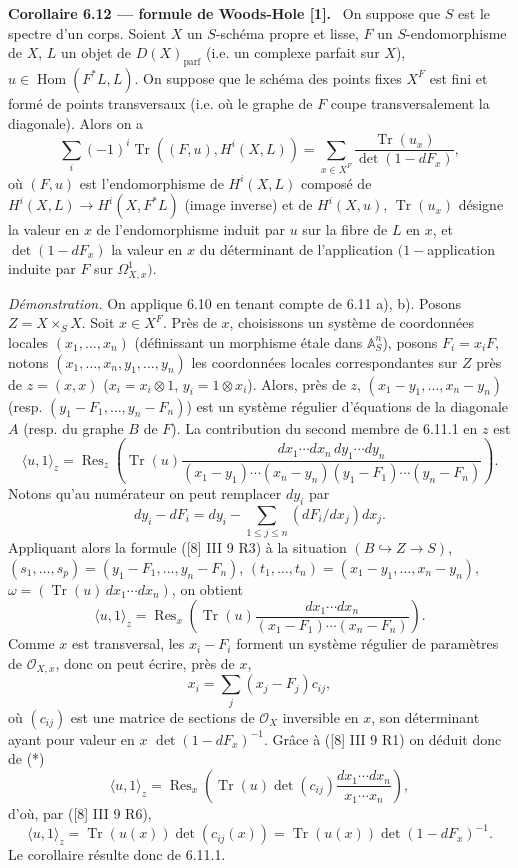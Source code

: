 \documentclass[11pt]{article}
\newenvironment{statement}[1]{\par\medskip\noindent\textbf{#1.}\ }{\par\medskip}
\DeclareMathOperator{\Hom}{Hom}
\providecommand{\Tr}{\operatorname{Tr}}
\providecommand{\parf}{\mathrm{parf}}
\providecommand{\OO}{\mathcal O}
\providecommand{\Res}{\operatorname{Res}}
\begin{document}
\begin{statement}{Corollaire 6.12 --- formule de Woods-Hole [1]}
On suppose que $S$ est le spectre d'un corps. Soient $X$ un $S$-schéma propre et lisse, $F$ un $S$-endomorphisme de $X$, $L$ un objet de $D(X)_{\parf}$ (i.e. un complexe parfait sur $X$), $u\in\Hom(F^*L,L)$. On suppose que le schéma des points fixes $X^F$ est fini et formé de points transversaux (i.e. où le graphe de $F$ coupe transversalement la diagonale). Alors on a
\begin{equation}
\tag{6.12.1}
\sum_i(-1)^i\Tr((F,u),H^i(X,L))=
\sum_{x\in X^F}\frac{\Tr(u_x)}{\det(1-dF_x)},
\end{equation}
où $(F,u)$ est l'endomorphisme de $H^i(X,L)$ composé de $H^i(X,L)\to H^i(X,F^*L)$ (image inverse) et de $H^i(X,u)$, $\Tr(u_x)$ désigne la valeur en $x$ de l'endomorphisme induit par $u$ sur la fibre de $L$ en $x$, et $\det(1-dF_x)$ la valeur en $x$ du déterminant de l'application $(1-$application induite par $F$ sur $\Omega^1_{X,x})$.

\emph{Démonstration.} On applique 6.10 en tenant compte de 6.11 a), b). Posons $Z=X\times_SX$. Soit $x\in X^F$. Près de $x$, choisissons un système de coordonnées locales $(x_1,\ldots,x_n)$ (définissant un morphisme étale dans $\mathbb A^n_S$), posons $F_i=x_iF$, notons $(x_1,\ldots,x_n,y_1,\ldots,y_n)$ les coordonnées locales correspondantes sur $Z$ près de $z=(x,x)$ ($x_i=x_i\otimes1$, $y_i=1\otimes x_i$). Alors, près de $z$, $(x_1-y_1,\ldots,x_n-y_n)$ (resp. $(y_1-F_1,\ldots,y_n-F_n)$) est un système régulier d'équations de la diagonale $A$ (resp. du graphe $B$ de $F$). La contribution du second membre de 6.11.1 en $z$ est
\[
\langle u,1\rangle_z=\Res_z\left(\Tr(u)\frac{dx_1\cdots dx_n\,dy_1\cdots dy_n}{(x_1-y_1)\cdots(x_n-y_n)(y_1-F_1)\cdots(y_n-F_n)}\right).
\]
Notons qu'au numérateur on peut remplacer $dy_i$ par
\[
dy_i-dF_i=dy_i-\sum_{1\le j\le n}(dF_i/dx_j)dx_j.
\]
Appliquant alors la formule ([8] III 9 R3) à la situation $(B\hookrightarrow Z\to S)$, $(s_1,\ldots,s_p)=(y_1-F_1,\ldots,y_n-F_n)$, $(t_1,\ldots,t_n)=(x_1-y_1,\ldots,x_n-y_n)$, $\omega=(\Tr(u)\,dx_1\cdots dx_n)$, on obtient
\begin{equation}
\tag{*}
\langle u,1\rangle_z=\Res_x\left(\Tr(u)\frac{dx_1\cdots dx_n}{(x_1-F_1)\cdots(x_n-F_n)}\right).
\end{equation}
Comme $x$ est transversal, les $x_i-F_i$ forment un système régulier de paramètres de $\OO_{X,x}$, donc on peut écrire, près de $x$,
\[
x_i=\sum_j(x_j-F_j)c_{ij},
\]
où $(c_{ij})$ est une matrice de sections de $\OO_X$ inversible en $x$, son déterminant ayant pour valeur en $x$ $\det(1-dF_x)^{-1}$. Grâce à ([8] III 9 R1) on déduit donc de (*)
\[
\langle u,1\rangle_z=\Res_x\left(\Tr(u)\det(c_{ij})\frac{dx_1\cdots dx_n}{x_1\cdots x_n}\right),
\]
d'où, par ([8] III 9 R6),
\[
\langle u,1\rangle_z=\Tr(u(x))\det(c_{ij}(x))=\Tr(u(x))\det(1-dF_x)^{-1}.
\]
Le corollaire résulte donc de 6.11.1.
\end{statement}
\end{document}
